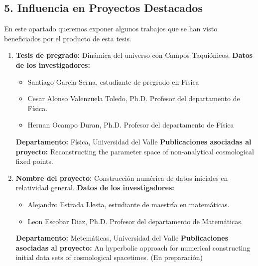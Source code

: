 \begin{spacing}{1.5}
    \begin{tightcenter}
    \section{5. Influencia en Proyectos Destacados}
    \end{tightcenter}

    En este apartado queremos exponer algunos trabajos que se han visto beneficiados por el producto de esta tesis.
    
    \begin{enumerate}

        \item \textbf{Tesis de pregrado:} Dinámica del universo con Campos Taquiónicos. \newline
        \textbf{Datos de los investigadores:}
        \begin{itemize}
            \item Santiago Garcia Serna, estudiante de pregrado en Física 
            \item Cesar Alonso Valenzuela Toledo, Ph.D. Profesor del departamento de Física. 
            \item Hernan Ocampo Duran, Ph.D. Profesor del departamento de Física 
        \end{itemize}
        \textbf{Departamento: } Física, Universidad del Valle \newline
        \textbf{Publicaciones asociadas al proyecto: } \newline Reconstructing the parameter space of non-analytical cosmological fixed points.\cite{Tesis1} 

        \item \textbf{Nombre del proyecto:} Construcción numérica de datos iniciales en relatividad general. \newline
        \textbf{Datos de los investigadores:}
        \begin{itemize}
            \item Alejandro Estrada Llesta, estudiante de maestría en matemáticas.
            \item Leon Escobar Diaz, Ph.D. Profesor del departamento de Matemáticas. 
        \end{itemize}
        \textbf{Departamento: } Metemáticas, Universidad del Valle \newline
        \textbf{Publicaciones asociadas al proyecto: } \newline An hyperbolic approach for numerical constructing initial data sets of cosmological spacetimes. (En preparación)


\end{enumerate}
\end{spacing}
